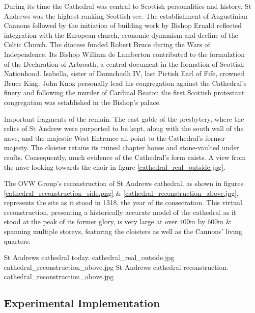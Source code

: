 During its time the Cathedral was central to Scottish personalities and history. St Andrews was the highest ranking Scottish see. The establishment of Augustinian Cannons followed by the initiation of
building work by Bishop Ernald reflected integration with the European church, economic dynamism and decline of the Celtic Church. The diocese funded Robert Bruce during the Wars of Independence. Its Bishop William de Lamberton contributed to the formulation of the Declaration of Arbroath, a central document in the formation of
Scottish Nationhood. Isabella, sister of Donnchadh IV, last Pictish Earl of Fife, crowned Bruce King. John Knox personally lead his congregation against the Cathedral’s finery and following the murder of Cardinal Beaton the first Scottish protestant congregation was established in the Bishop’s palace.

Important fragments of the remain. The east gable of the presbytery, where the relics of St Andrew were purported to be kept, along with the south wall of the nave, and the majestic West Entrance all point to the Cathedral’s former majesty. The cloister retains its ruined chapter house and stone-vaulted under crofts. Consequently, much evidence of the Cathedral’s form exists. A view from the nave looking towards the choir in figure \ref{cathedral_real_outside.jpg}.


The OVW Group's reconstruction of St Andrews cathedral, as shown in figures \ref{cathedral_reconstruction_side.png} \& \ref{cathedral_reconstruction_above.jpg}, represents the site as it stood in 1318, the year of its consecration. This virtual reconstruction, presenting a historically accurate model of the cathedral as it stood at the peak of its former glory, is very large at over 400m by 600m \& spanning multiple storeys, featuring the cloisters as well as the Cannons' living quarters.

 {St Andrews cathedral today.} {cathedral_real_outside.jpg}
       {cathedral_reconstruction_above.jpg} {St Andrews cathedral reconstruction.} {cathedral_reconstruction_above.jpg}


\subsection{Experimental Implementation}

